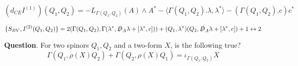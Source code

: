 \documentclass[12pt]{amsart}
\newcommand{\sD}{\slashed{D}}
\begin{document}
\[
(d_{CE} I^{(1)})(Q_1, Q_2) = -L_{\Gamma(Q_1, Q_2)}(A)\wedge A^* - \langle\Gamma(Q_1, Q_2).\lambda, \lambda^*\rangle - (\Gamma(Q_1, Q_2).c) c^*
\]

\[
\{S_{BV}, I^{(2)}(Q_1, Q_2)\} = 2(\Gamma(Q_1, Q_2), \Gamma(\lambda^*, \sD_A \lambda + [\lambda^*, c])) + (Q_1, \lambda^*)(Q_2, \sD_A \lambda + [\lambda^*, c]) + 1\leftrightarrow 2
\]

\textbf{Question}. For two spinors $Q_1, Q_2$ and a two-form $X$, is the following true?
\[\Gamma(Q_1, \rho(X) Q_2) + \Gamma(Q_2, \rho(X) Q_1) = \iota_{\Gamma(Q_1, Q_2)} X\]
\end{document}
